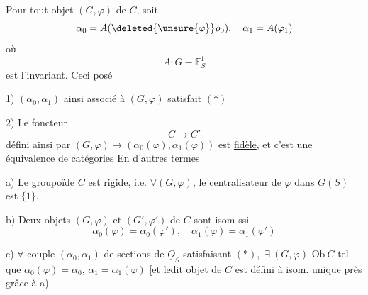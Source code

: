 Pour tout objet  $(G,\varphi)$ de $C$, soit
\[\alpha_0=A(\deleted{\unsure{\varphi}}\rho_0),\quad\alpha_1=A(\varphi_1)\]
où
\[A:G\mathbin{-}\mathbb E^1_S\]
est l'invariant.  Ceci posé

1) $(\alpha_0,\alpha_1)$ ainsi associé à $(G,\varphi)$ satisfait $(*)$

2) Le foncteur
\[ C\longrightarrow C' \]
défini ainsi par $(G,\varphi)\longmapsto(\alpha_0(\varphi),\alpha_1(\varphi))$ est \uline{ fidèle},
et c'est une  équivalence de catégories  En d'autres termes

a) Le groupoïde $C$ est \uline{rigide}, i.e. $\forall (G,\varphi)$, le centralisateur de
$\varphi$ dans $G(S)$ est $\{1\}$.

b) Deux objets $(G,\varphi)$ et $(G',\varphi')$ de $C$ sont isom ssi
\[\alpha_0(\varphi)=\alpha_0(\varphi'),\quad\alpha_1(\varphi)=\alpha_1(\varphi')\]

c)  $\forall$ couple $(\alpha_0,\alpha_1)$  de sections de $\underline O_S$ satisfaisant $(*),$
$\exists\ (G,\varphi)$  $\mathrm{Ob}\ C$ tel que $\alpha_0(\varphi)=\alpha_0$, $\alpha_1=\alpha_1(\varphi)$ [et
ledit objet de $C$ est défini à isom. unique près grâce à a)]
